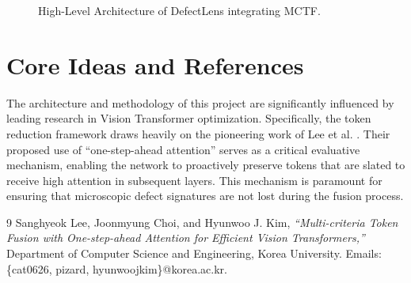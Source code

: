 \documentclass[12pt]{article}
\begin{document}
\begin{figure}[htpb]
    \centering
    \caption{High-Level Architecture of DefectLens integrating MCTF.}
    \label{fig:architecture}
\end{figure}

\section{Core Ideas and References}
The architecture and methodology of this project are significantly influenced by leading research in Vision Transformer optimization. Specifically, the token reduction framework draws heavily on the pioneering work of Lee et al. \cite{lee2023multi}. Their proposed use of ``one-step-ahead attention'' serves as a critical evaluative mechanism, enabling the network to proactively preserve tokens that are slated to receive high attention in subsequent layers. This mechanism is paramount for ensuring that microscopic defect signatures are not lost during the fusion process.

\begin{thebibliography}{9}
Sanghyeok Lee, Joonmyung Choi, and Hyunwoo J. Kim,
\textit{``Multi-criteria Token Fusion with One-step-ahead Attention for Efficient Vision Transformers,''}
Department of Computer Science and Engineering, Korea University.
Emails: \{cat0626, pizard, hyunwoojkim\}@korea.ac.kr.
\end{thebibliography}
\end{document}
